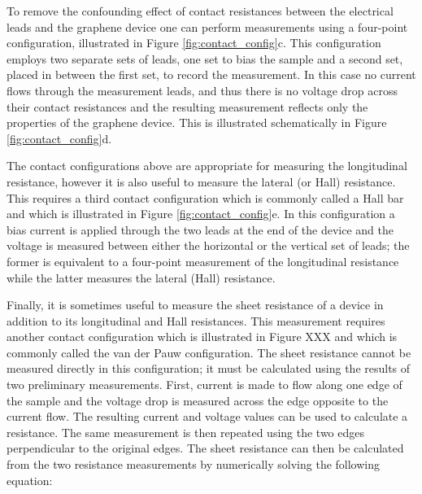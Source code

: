 \documentclass[edeposit,fullpage,draftthesis]{uiucthesis2009}
\begin{document}
            To remove the confounding effect of contact resistances between the electrical leads and the graphene
            device one can perform measurements using a four-point configuration, illustrated in
            Figure \ref{fig:contact_config}c. This configuration employs two separate sets of leads, one set to
            bias the sample and a second set, placed in between the first set, to record the measurement. 
            In this case no current flows through the measurement leads, and thus there is no voltage drop
            across their contact resistances and the resulting measurement reflects only the properties of 
            the graphene device. This is illustrated schematically in Figure \ref{fig:contact_config}d.
            
            The contact configurations above are appropriate for measuring the longitudinal resistance, however it 
            is also useful to measure the lateral (or Hall) resistance. This requires a third contact configuration
            which is commonly called a Hall bar and which is illustrated in Figure \ref{fig:contact_config}e.
            In this configuration a bias current is applied through the two leads at the end of the device
            and the voltage is measured between either the horizontal or the vertical set of leads; the former 
            is equivalent to a four-point measurement of the longitudinal resistance while the latter measures
            the lateral (Hall) resistance.
            
            Finally, it is sometimes useful to measure the sheet resistance of a device in addition to 
            its longitudinal and Hall resistances.
            This measurement requires another contact configuration which is illustrated in Figure XXX
            and which is commonly called the van der Pauw configuration\cite{van1958method}.
            The sheet resistance cannot be measured directly in this configuration; it must be calculated
            using the results of two preliminary measurements. First, current is made to flow along one
            edge of the sample and the voltage drop is measured across the edge opposite to the current flow.
            The resulting current and voltage values can be used to calculate a resistance.
            The same measurement is then repeated using the two edges perpendicular to the original edges.
            The sheet resistance can then be calculated from the two resistance measurements by numerically
            solving the following equation:
            
\end{document}

